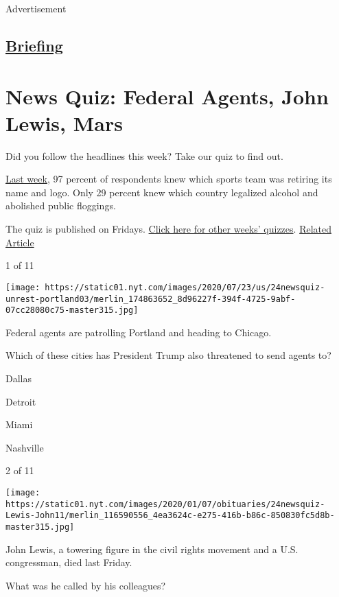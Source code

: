 Advertisement

\hypertarget{-briefing-}{%
\subsection{\texorpdfstring{
\href{/interactive/2018/briefing/global-morning-briefing-newsletter-signup.html}{Briefing}
}{ Briefing }}\label{-briefing-}}

\hypertarget{news-quiz-federal-agents-john-lewis-mars}{%
\section{News Quiz: Federal Agents, John Lewis,
Mars}\label{news-quiz-federal-agents-john-lewis-mars}}

Did you follow the headlines this week? Take our quiz to find out.

\href{https://www.nytimes.com/interactive/2020/07/17/briefing/china-twitter-disney-news-quiz.html}{Last
week}, 97 percent of respondents knew which sports team was retiring its
name and logo. Only 29 percent knew which country legalized alcohol and
abolished public floggings.

The quiz is published on Fridays.
\href{https://www.nytimes.com/spotlight/news-quiz}{Click here for other
weeks' quizzes}.
\href{https://www.nytimes.com/interactive/2020/07/17/briefing/china-twitter-disney-news-quiz.html}{Related
Article}

1 of 11

\texttt{[image: https://static01.nyt.com/images/2020/07/23/us/24newsquiz-unrest-portland03/merlin\_174863652\_8d96227f-394f-4725-9abf-07cc28080c75-master315.jpg]}

Federal agents are patrolling Portland and heading to Chicago.

Which of these cities has President Trump also threatened to send agents
to?

Dallas

Detroit

Miami

Nashville

2 of 11

\texttt{[image: https://static01.nyt.com/images/2020/01/07/obituaries/24newsquiz-Lewis-John11/merlin\_116590556\_4ea3624c-e275-416b-b86c-850830fc5d8b-master315.jpg]}

John Lewis, a towering figure in the civil rights movement and a U.S.
congressman, died last Friday.

What was he called by his colleagues?

